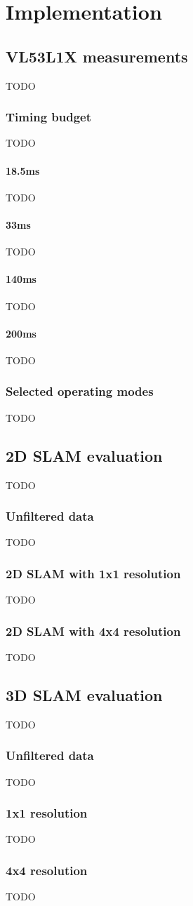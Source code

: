 \chapter{Implementation}

\section{VL53L1X measurements}
TODO
\subsection{Timing budget}
TODO
\subsubsection{18.5ms}
TODO
\subsubsection{33ms}
TODO
\subsubsection{140ms}
TODO
\subsubsection{200ms}
TODO
\subsection{Selected operating modes}
TODO


\section{2D SLAM evaluation}
TODO
\subsection{Unfiltered data}
TODO
\subsection{2D SLAM with 1x1 resolution}
TODO
\subsection{2D SLAM with 4x4 resolution}
TODO

\section{3D SLAM evaluation}
TODO
\subsection{Unfiltered data}
TODO
\subsection{1x1 resolution}
TODO
\subsection{4x4 resolution}
TODO
